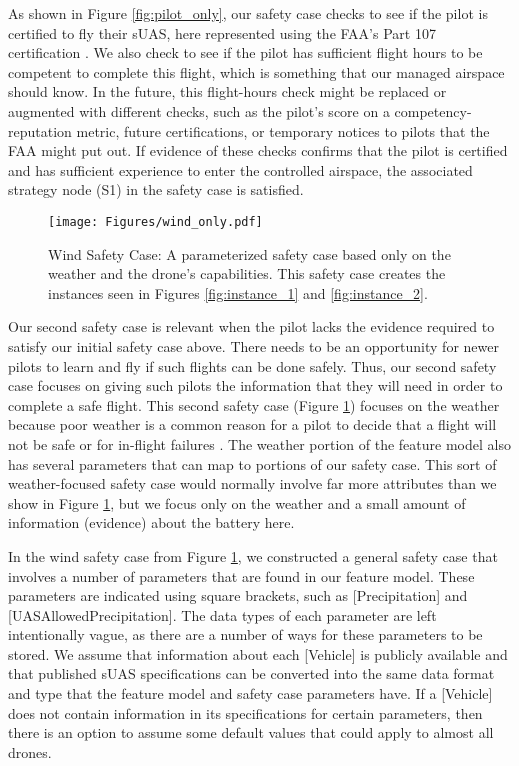 As shown in Figure \ref{fig:pilot_only}, our safety case checks to see if the pilot is certified to fly their sUAS, here represented using the FAA's Part 107 certification \cite{FAA_part107}. We also check to see if the pilot has sufficient flight hours to be competent to complete this flight, which is something that our managed airspace should know.  In the future, this flight-hours check might be replaced or augmented with different checks, such as the pilot's score on a competency-reputation metric, future certifications, or temporary notices to pilots that the FAA might put out. If evidence of these checks confirms that the pilot is certified and has sufficient experience to enter the controlled airspace, the associated strategy node (S1) in the safety case is satisfied.

\begin{figure}[ht]
    \centering
    \texttt{[image: Figures/wind\_only.pdf]}
    \caption{Wind Safety Case: A parameterized safety case based only on the weather and the drone's capabilities. This safety case creates the instances seen in Figures \ref{fig:instance_1} and \ref{fig:instance_2}.}
    \label{fig:wind_only}
\end{figure}

Our second safety case is relevant when the pilot lacks the evidence required to satisfy our initial safety case above. There needs to be an opportunity for newer pilots to learn and fly if such flights can be done safely. Thus, our second safety case focuses on giving such pilots the information that they will need in order to complete a safe flight. This second safety case (Figure \ref{fig:wind_only}) focuses on the weather because poor weather is a common reason for a pilot to decide that a flight will not be safe or for in-flight failures \cite{weather_hazards_for_UAV}. The weather portion of the feature model also has several parameters that can map to portions of our safety case. This sort of weather-focused safety case would normally involve far more attributes than we show in Figure \ref{fig:wind_only}, but we focus only on the weather and a small amount of information (evidence) about the battery here.

In the wind safety case from Figure \ref{fig:wind_only}, we constructed a general safety case that involves a number of parameters that are found in our feature model. These parameters are indicated using square brackets, such as [Precipitation] and [UASAllowedPrecipitation]. The data types of each parameter are left intentionally vague, as there are a number of ways for these parameters to be stored. We assume that information about each [Vehicle] is publicly available and that published sUAS specifications can be converted into the same data format and type that the feature model and safety case parameters have. If a [Vehicle] does not contain information in its specifications for certain parameters, then there is an option to assume some default values that could apply to almost all drones. 

